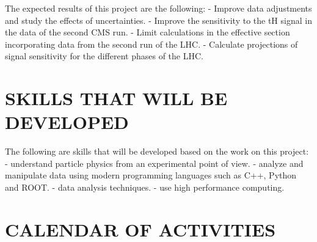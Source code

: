 \documentclass[final,3p]{CSP}
\begin{document}
The expected results of this project are the following:
- Improve data adjustments and study the effects of uncertainties.
- Improve the sensitivity to the tH signal in the data of the second CMS run.
- Limit calculations in the effective section incorporating data from the second run of the LHC.
- Calculate projections of signal sensitivity for the different phases of the LHC.



\section{SKILLS THAT WILL BE DEVELOPED}
The following are skills that will be developed based on the work on this project:
- understand particle physics from an experimental point of view.
- analyze and manipulate data using modern programming languages such as C++, Python and ROOT.
- data analysis techniques.
- use high performance computing.

\section{CALENDAR OF ACTIVITIES}



\cleardoublepage

\end{document}
